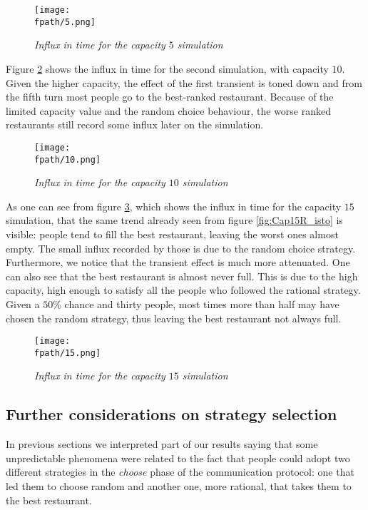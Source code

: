\documentclass[10pt,a4paper,usenatbib]{article}
\newcommand{\fpath}{./Figs/}
\begin{document}
\begin{figure}[!htb]
\centering
\texttt{[image: \\fpath/5.png]}
\caption{\small \textit{Influx in time for the capacity $5$ simulation}}
\label{fig:Cap5R_time}
\end{figure}

Figure \ref{fig:Cap10R_time} shows the influx in time for the second simulation, with capacity $10$. Given the higher capacity, the effect of the first transient is toned down and from the fifth turn most people go to the best-ranked restaurant. Because of the limited capacity value and the random choice behaviour, the worse ranked restaurants still record some influx later on the simulation.

\begin{figure}[!htb]
\centering
\texttt{[image: \\fpath/10.png]}
\caption{\small \textit{Influx in time for the capacity $10$ simulation}}
\label{fig:Cap10R_time}
\end{figure}

As one can see from figure \ref{fig:Cap15R_time}, which shows the influx in time for the capacity $15$ simulation, that the same trend already seen from figure \ref{fig:Cap15R_isto} is visible: people tend to fill the best restaurant, leaving the worst ones almost empty. The small influx recorded by those is due to the random choice strategy. Furthermore, we notice that the transient effect is much more attenuated.
One can also see that the best restaurant is almost never full. This is due to the high capacity, high enough to satisfy all the people who followed the rational strategy. Given a $50\%$ chance and thirty people, most times more than half may have chosen the random strategy, thus leaving the best restaurant not always full.

\begin{figure}[!htb]
\centering
\texttt{[image: \\fpath/15.png]}
\caption{\small \textit{Influx in time for the capacity $15$ simulation}}
\label{fig:Cap15R_time}
\end{figure}

\subsection{Further considerations on strategy selection}
\label{subsec:further_considerations}

In previous sections we interpreted part of our results saying that some unpredictable phenomena were related to the fact that people could adopt two different strategies in the \textit{choose} phase of the
communication protocol: one that led them to choose random and another one, more rational, that takes them to the best restaurant. 
\end{document}
